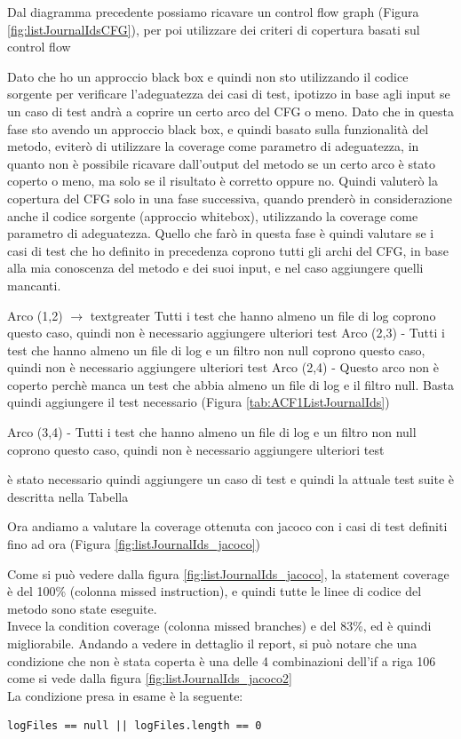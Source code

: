 \documentclass[12pt, a4paper]{article}
\begin{document}
Dal diagramma precedente possiamo 
ricavare un control flow graph (Figura \ref{fig:listJournalIdsCFG}), per poi
utilizzare dei criteri di copertura basati sul control flow

Dato che ho un approccio black box e quindi non sto utilizzando il codice sorgente per verificare l'adeguatezza dei casi di test,
ipotizzo in base agli input se un caso di test andrà a coprire un certo arco del CFG o meno.
Dato che in questa fase sto avendo un approccio black box, e quindi basato sulla funzionalità del metodo, 
eviterò di utilizzare la coverage come parametro di adeguatezza, in quanto non è possibile ricavare
dall'output del metodo se un certo arco è stato coperto o meno, ma solo se il risultato è corretto oppure no.
Quindi valuterò la copertura del CFG solo in una fase successiva, quando prenderò in considerazione
anche il codice sorgente (approccio whitebox), utilizzando la coverage come parametro di adeguatezza.
Quello che farò in questa fase è quindi valutare se i casi di test che ho definito in precedenza
coprono tutti gli archi del CFG, in base alla mia conoscenza del metodo e dei suoi input, e nel caso
aggiungere quelli mancanti.

Arco (1,2)  $\rightarrow$ textgreater Tutti i test che hanno almeno un file di log coprono questo caso, quindi non è necessario aggiungere ulteriori test
Arco (2,3)  - \> Tutti i test che hanno almeno un file di log e un filtro non null coprono questo caso, quindi non è necessario aggiungere ulteriori test
Arco (2,4)  -\> 
Questo arco non è coperto perchè manca un test che abbia almeno un file di log e il filtro null. Basta quindi aggiungere il 
test necessario (Figura \ref{tab:ACF1ListJournalIds})


Arco (3,4)  -\> Tutti i test che hanno almeno un file di log e un filtro non null coprono questo caso, quindi non è necessario aggiungere ulteriori test


è stato necessario quindi aggiungere un caso di test e quindi la attuale test suite è descritta nella Tabella 


Ora andiamo a valutare la coverage ottenuta con jacoco con i casi di test definiti
fino ad ora (Figura \ref{fig:listJournalIds_jacoco})

Come si può vedere dalla figura \ref{fig:listJournalIds_jacoco},
la statement coverage è del 100\% (colonna missed instruction), 
e quindi tutte le linee di codice del metodo sono state eseguite. \\
Invece la condition coverage (colonna missed branches) e del 83\%, ed è quindi migliorabile.
Andando a vedere in dettaglio il report, si può notare che una condizione che non è stata coperta
è una delle 4 combinazioni dell'if a riga 106 come si vede dalla figura \ref{fig:listJournalIds_jacoco2}
\\
La condizione presa in esame è la seguente:
\begin{verbatim}
logFiles == null || logFiles.length == 0
\end{verbatim}
\end{document}
